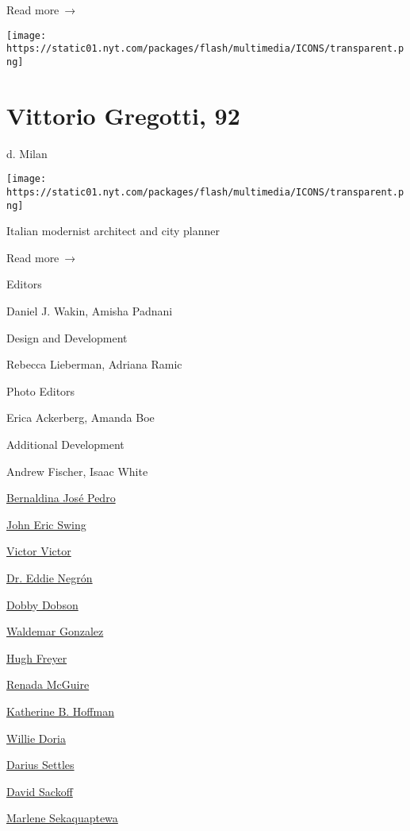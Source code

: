  Read more~→

\href{https://www.nytimes.com/2020/03/16/arts/vittorio-gregotti-dies-coronavirus.html}{}

\texttt{[image: https://static01.nyt.com/packages/flash/multimedia/ICONS/transparent.png]}

\hypertarget{vittorio-gregotti-92}{%
\section{Vittorio Gregotti, 92}\label{vittorio-gregotti-92}}

d. Milan

\texttt{[image: https://static01.nyt.com/packages/flash/multimedia/ICONS/transparent.png]}

Italian modernist architect and city planner

 Read more~→

Editors

Daniel J. Wakin, Amisha Padnani

Design and Development

Rebecca Lieberman, Adriana Ramic

Photo Editors

Erica Ackerberg, Amanda Boe

Additional Development

Andrew Fischer, Isaac White

\protect\hyperlink{bernaldina-josuxe9-pedro}{Bernaldina José Pedro}

\protect\hyperlink{john-eric-swing}{John Eric Swing}

\protect\hyperlink{victor-victor-}{Victor Victor}

\protect\hyperlink{dr-eddie-negruxf3n}{Dr. Eddie Negrón}

\protect\hyperlink{dobby-dobson}{Dobby Dobson}

\protect\hyperlink{waldemar-gonzalez}{Waldemar Gonzalez}

\protect\hyperlink{hugh-freyer}{Hugh Freyer}

\protect\hyperlink{renada-mcguire}{Renada McGuire}

\protect\hyperlink{katherine-b-hoffman}{Katherine B. Hoffman}

\protect\hyperlink{willie-doria}{Willie Doria}

\protect\hyperlink{darius-settles}{Darius Settles}

\protect\hyperlink{david-sackoff}{David Sackoff}

\protect\hyperlink{marlene-sekaquaptewa}{Marlene Sekaquaptewa}

